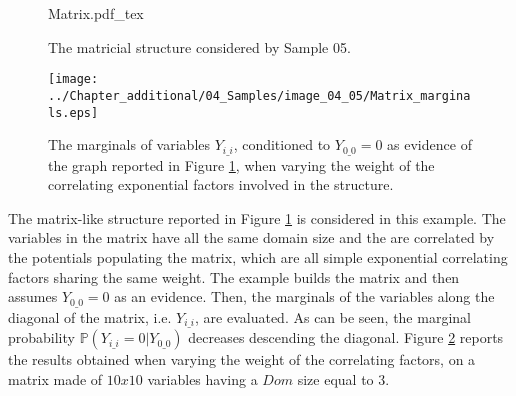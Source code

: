 \begin{figure}
	\centering
\def\svgwidth{0.55 \textwidth}
{Matrix.pdf_tex} 
\caption{The matricial structure considered by Sample 05.}
\label{fig:sample_04:1}
\end{figure}

\begin{figure}
	\centering
\texttt{[image: ../Chapter\_additional/04\_Samples/image\_04\_05/Matrix\_marginals.eps]}
\caption{The marginals of variables $Y_{i\_i}$, conditioned to $Y_{0\_0}= 0$ as evidence of the graph reported in Figure \ref{fig:sample_04:1}, when varying the weight of the correlating exponential factors involved in the structure.}
\label{fig:sample_04:2}
\end{figure} 

The matrix-like structure reported in Figure \ref{fig:sample_04:1} is considered in this example. The variables in the matrix have all the same domain size and the are correlated by the potentials populating the matrix, which are all simple exponential correlating factors sharing the same weight.
The example builds the matrix and then assumes $Y_{0\_0} = 0$ as an evidence. Then, the marginals of the variables along the diagonal of the matrix, i.e. $Y_{i\_i}$, are evaluated. As can be seen, the marginal probability $\mathbb{P}(Y_{i\_i} = 0 | Y_{0\_0})$ decreases descending the diagonal. Figure \ref{fig:sample_04:2} reports the results obtained when varying the weight of the correlating factors, on a matrix made of $10x10$ variables having a $Dom$ size equal to $3$.